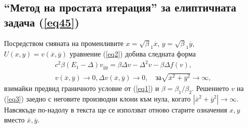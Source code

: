 \documentclass[a4paper]{article}
\newcommand{\rf}[1]{(\ref{#1})}
\theoremstyle{remark}
\begin{document}
\subsection{``Метод на простата итерация'' за елиптичната задача \rf{eq45}}\label{simpleIteration}
Посредством смяната на променливите $x=\sqrt\beta_1 { \overline x}$, $y=\sqrt\beta_1 { \overline y}$, $U(x,y)= v({ \overline x},{ \overline y} )$ уравнение 
\rf{eq2} добива следната форма
 \begin{align}\label{eq3}
&c^2 \beta (E_1- \Delta) v_{{\overline y}{\overline y}} = \beta \Delta v - \Delta^2 v - \beta \Delta f(v), \\ 
&v(\overline x, \overline y) \rightarrow 0,  \Delta v(\overline x, \overline y) \rightarrow 0 ,  \quad \text{за}  \sqrt{\overline x^2 + \overline y^2} \rightarrow \infty, \nonumber
\end{align}
взимайки предвид граничното условие от \rf{eq1} и $\beta = \beta_1 / \beta_2$.
Решението $v$ на \rf{eq3} заедно с неговите производни клони към нула, когато $|{\overline x}^2 +{\overline y}^2|\rightarrow \infty$.
Навсякъде по-надолу в текста ще се използват отново старите означения $x,y$ вместо ${\overline x},{\overline y}$.
\end{document}
